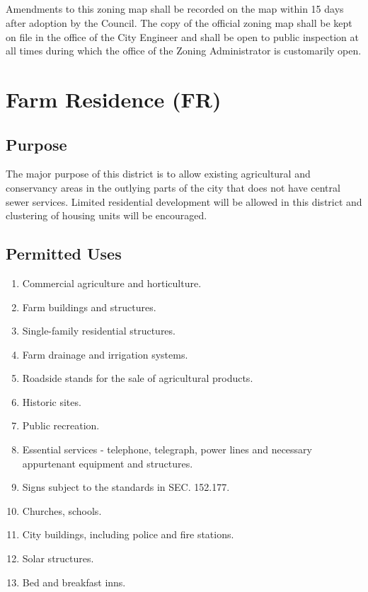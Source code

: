 \subsection{}
Amendments to this zoning map shall be recorded on the map within 15 days after adoption by the Council.  The copy of the official zoning map shall be kept on file in the office of the City Engineer and shall be open to public inspection at all times during which the office of the Zoning Administrator is customarily open.


\setcounter{section}{34}
\section{Farm Residence (FR)}
\subsection{Purpose}
The major purpose of this district is to allow existing agricultural and conservancy areas in the outlying parts of the city that does not have central sewer services. Limited residential development will be allowed in this district and clustering of housing units will be encouraged.
\subsection{Permitted Uses}
\begin{enumerate}[{\indent}1)]
    \item Commercial agriculture and horticulture.
    \item Farm buildings and structures.
    \item Single-family residential structures.
    \item Farm drainage and irrigation systems.
    \item Roadside stands for the sale of agricultural products.
    \item Historic sites.
    \item Public recreation.
    \item Essential services - telephone, telegraph, power lines and necessary appurtenant equipment and structures.
    \item Signs subject to the standards in SEC. 152.177.
    \item Churches, schools.
    \item City buildings, including police and fire stations.
    \item Solar structures.
    \item Bed and breakfast inns.
\end{enumerate}
